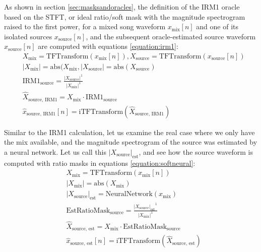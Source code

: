\documentclass[report.tex]{subfiles}
\begin{document}
As shown in section \ref{sec:masksandoracles}, the definition of the IRM1 oracle based on the STFT, or ideal ratio/soft mask with the magnitude spectrogram raised to the first power, for a mixed song waveform $x_{\text{mix}}[n]$ and one of its isolated sources $x_{\text{source}}[n]$, and the subsequent oracle-estimated source waveform $\hat{x}_{\text{source}}[n]$ are computed with equations \eqref{equation:irm1}:
\begin{align}\tag{27}\label{equation:irm1}
	\nonumber & X_{\text{mix}} = \text{TFTransform}(x_{\text{mix}}[n]), X_{\text{source}} = \text{TFTransform}(x_{\text{source}}[n])\\
	\nonumber & |X_{\text{mix}}| = \text{abs}(X_{\text{mix}}, |X_{\text{source}}| = \text{abs}(X_{\text{source}})\\
	\nonumber & \text{IRM1}_{\text{source}} = \frac{|X_{\text{source}}|^{1}}{|X_{\text{mix}}|^{1}}\\
	\nonumber & \hat{X}_{\text{source, IRM1}} = X_{\text{mix}} \cdot \text{IRM1}_{\text{source}}\\
	\nonumber & \hat{x}_{\text{source, IRM1}}[n] = \text{iTFTransform}(\hat{X}_{\text{source, IRM1}})
\end{align}

Similar to the IRM1 calculation, let us examine the real case where we only have the mix available, and the magnitude spectrogram of the source was estimated by a neural network. Let us call this $|X_{\text{source}}|_{\text{est}}$, and see how the source waveform is computed with ratio masks in equations \eqref{equation:softneural}:
\begin{align}\tag{28}\label{equation:softneural}
	\nonumber & X_{\text{mix}} = \text{TFTransform}(x_{\text{mix}}[n])\\
	\nonumber & |X_{\text{mix}}| = \text{abs}(X_{\text{mix}})\\
	\nonumber & {|X_{\text{source}}|}_{\text{est}} = \text{NeuralNetwork}(x_{\text{mix}})\\
	\nonumber & \text{EstRatioMask}_{\text{source}} = \frac{{|X_{\text{source}}|_{\text{est}}}^{1}}{|X_{\text{mix}}|^{1}}\\
	\nonumber & \hat{X}_{\text{source, est}} = X_{\text{mix}} \cdot \text{EstRatioMask}_{\text{source}}\\
	\nonumber & \hat{x}_{\text{source, est}}[n] = \text{iTFTransform}(\hat{X}_{\text{source, est}})
\end{align}
\end{document}
